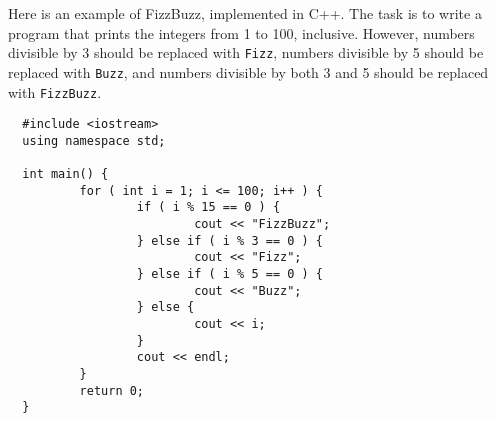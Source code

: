 \documentclass[letterpaper]{article}
\begin{document}
Here is an example of FizzBuzz, implemented in C++. The task is to write a
program that prints the integers from 1 to 100, inclusive. However, numbers
divisible by 3 should be replaced with \texttt{Fizz}, numbers divisible by 5
should be replaced with \texttt{Buzz}, and numbers divisible by both 3 and 5
should be replaced with \texttt{FizzBuzz}.

\begin{verbatim}
  #include <iostream>
  using namespace std;

  int main() {
          for ( int i = 1; i <= 100; i++ ) {
                  if ( i % 15 == 0 ) {
                          cout << "FizzBuzz";
                  } else if ( i % 3 == 0 ) {
                          cout << "Fizz";
                  } else if ( i % 5 == 0 ) {
                          cout << "Buzz";
                  } else {
                          cout << i;
                  }
                  cout << endl;
          }
          return 0;
  }
\end{verbatim}
\end{document}

